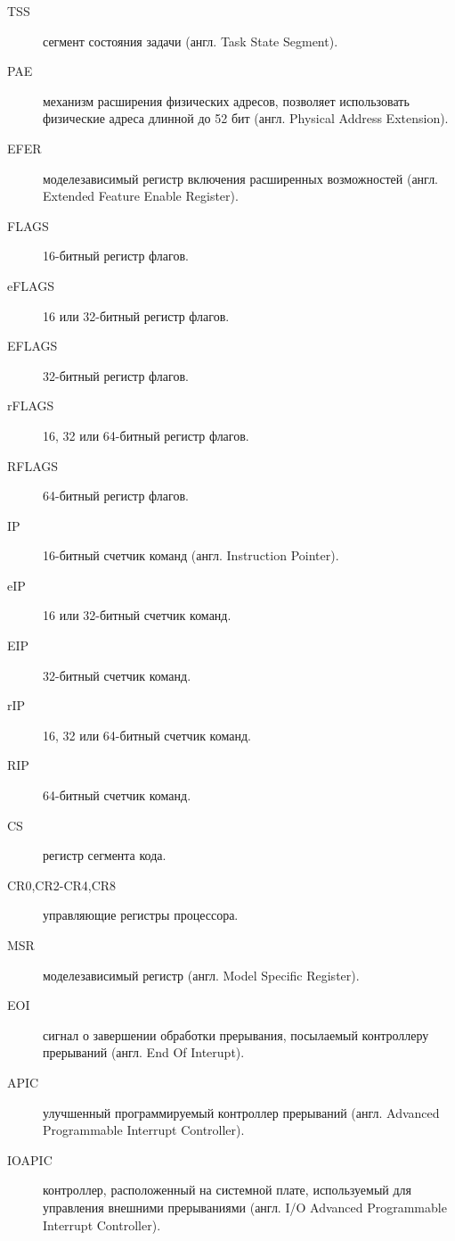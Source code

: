 \begin{description}
\item[TSS] сегмент состояния задачи (англ. Task State Segment).
\item[PAE] механизм расширения физических адресов, позволяет использовать физические адреса длинной
до 52 бит (англ. Physical Address Extension).
\item[EFER] моделезависимый регистр включения расширенных возможностей (англ. Extended Feature Enable Register).
\item[FLAGS] 16-битный регистр флагов.
\item[eFLAGS] 16 или 32-битный регистр флагов.
\item[EFLAGS] 32-битный регистр флагов.
\item[rFLAGS] 16, 32 или 64-битный регистр флагов.
\item[RFLAGS] 64-битный регистр флагов.
\item[IP] 16-битный счетчик команд (англ. Instruction Pointer).
\item[eIP] 16 или 32-битный счетчик команд.
\item[EIP] 32-битный счетчик команд.
\item[rIP] 16, 32 или 64-битный счетчик команд.
\item[RIP] 64-битный счетчик команд.
\item[CS] регистр сегмента кода.
\item[CR0,CR2-CR4,CR8] управляющие регистры процессора.
\item[MSR] моделезависимый регистр (англ. Model Specific Register).
\item[EOI] сигнал о завершении обработки прерывания, посылаемый
	контроллеру прерываний (англ. End Of Interupt).
\item[APIC] улучшенный программируемый контроллер прерываний (англ. Advanced Programmable Interrupt Controller).
\item[IOAPIC] контроллер, расположенный на системной плате,
	используемый для управления внешними прерываниями (англ. I/O Advanced Programmable Interrupt Controller).
\end{description}
